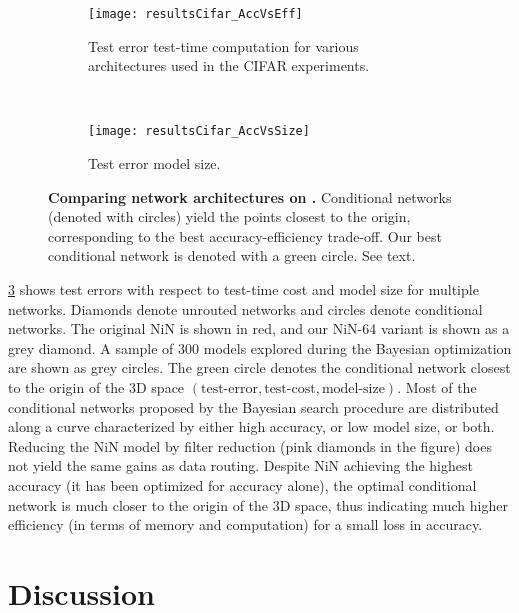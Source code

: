 \documentclass[thesis]{subfiles}
\begin{document}
	
	\begin{figure}[tbp] 
		\centering
		\begin{subfigure}[b]{0.9\linewidth}
			\centering
			\texttt{[image: resultsCifar\_AccVsEff]}
			\caption{Test error \vs test-time computation for various architectures used in the CIFAR experiments.}\label{fig:resultsCifar_AccVsEff}
		\end{subfigure}
		~
		\begin{subfigure}[b]{0.9\linewidth}
			\centering
			\texttt{[image: resultsCifar\_AccVsSize]}
			\caption{Test error \vs model size.}\label{fig:resultsCifar_AccVsSize}
		\end{subfigure}
		\caption[Comparing network architectures on ]{\textbf{Comparing network architectures on .} Conditional networks (denoted with circles) yield the points closest to the origin, corresponding to the best accuracy-efficiency trade-off. Our best conditional network is denoted with a green circle. See text.}\label{fig:Cifar_results}
	\end{figure}
	\cref{fig:Cifar_results} shows test errors with respect to test-time cost and model size for multiple networks.
	Diamonds denote unrouted networks and circles denote conditional networks. 
	The original NiN is shown in red, and our NiN-64 variant is shown as a grey diamond.
	A sample of 300 models explored during the Bayesian optimization are shown as grey circles.
	The green circle denotes the conditional network closest to the origin of the 
	3D space $(\textrm{test-error}, \textrm{test-cost}, \textrm{model-size})$.
	Most of the conditional networks proposed by the Bayesian search procedure are distributed along a curve characterized by either high accuracy, or low model size, or both. 
	Reducing the NiN model by filter reduction (pink diamonds in the figure) does not yield the same gains as data routing.
	Despite NiN achieving the highest accuracy (it has been optimized for accuracy alone), the optimal conditional network is much closer to the origin of the 3D space, thus indicating much higher efficiency (in terms of memory and computation) for a small loss in accuracy.
	
	\section{Discussion}

\end{document}
